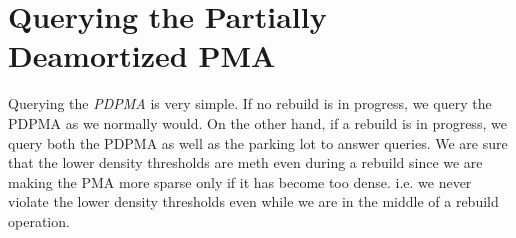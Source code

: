 \documentclass{article}
\begin{document}
\section{Querying the Partially Deamortized PMA}

Querying the \textit{PDPMA} is very simple. If no rebuild is in
progress, we query the PDPMA as we normally would. On the other hand,
if a rebuild is in progress, we query both the PDPMA as well as the
parking lot to answer queries. We are sure that the lower density
thresholds are meth even during a rebuild since we are making the PMA
more sparse only if it has become too dense. i.e. we never violate the
lower density thresholds even while we are in the middle of a rebuild
operation.
\end{document}
